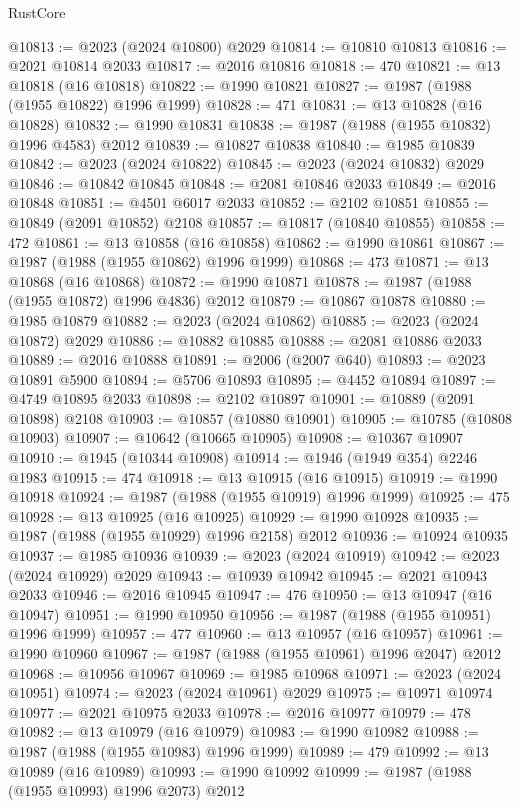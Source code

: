 \begin{lexlean}{RustCore}
\begin{coremodule}
@10813 := @2023 (@2024 @10800) @2029
@10814 := @10810 @10813
@10816 := @2021 @10814 @2033
@10817 := @2016 @10816
@10818 := 470
@10821 := @13 @10818 (@16 @10818)
@10822 := @1990 @10821
@10827 := @1987 (@1988 (@1955 @10822) @1996 @1999)
@10828 := 471
@10831 := @13 @10828 (@16 @10828)
@10832 := @1990 @10831
@10838 := @1987 (@1988 (@1955 @10832) @1996 @4583) @2012
@10839 := @10827 @10838
@10840 := @1985 @10839
@10842 := @2023 (@2024 @10822)
@10845 := @2023 (@2024 @10832) @2029
@10846 := @10842 @10845
@10848 := @2081 @10846 @2033
@10849 := @2016 @10848
@10851 := @4501 @6017 @2033
@10852 := @2102 @10851
@10855 := @10849 (@2091 @10852) @2108
@10857 := @10817 (@10840 @10855)
@10858 := 472
@10861 := @13 @10858 (@16 @10858)
@10862 := @1990 @10861
@10867 := @1987 (@1988 (@1955 @10862) @1996 @1999)
@10868 := 473
@10871 := @13 @10868 (@16 @10868)
@10872 := @1990 @10871
@10878 := @1987 (@1988 (@1955 @10872) @1996 @4836) @2012
@10879 := @10867 @10878
@10880 := @1985 @10879
@10882 := @2023 (@2024 @10862)
@10885 := @2023 (@2024 @10872) @2029
@10886 := @10882 @10885
@10888 := @2081 @10886 @2033
@10889 := @2016 @10888
@10891 := @2006 (@2007 @640)
@10893 := @2023 @10891 @5900
@10894 := @5706 @10893
@10895 := @4452 @10894
@10897 := @4749 @10895 @2033
@10898 := @2102 @10897
@10901 := @10889 (@2091 @10898) @2108
@10903 := @10857 (@10880 @10901)
@10905 := @10785 (@10808 @10903)
@10907 := @10642 (@10665 @10905)
@10908 := @10367 @10907
@10910 := @1945 (@10344 @10908)
@10914 := @1946 (@1949 @354) @2246 @1983
@10915 := 474
@10918 := @13 @10915 (@16 @10915)
@10919 := @1990 @10918
@10924 := @1987 (@1988 (@1955 @10919) @1996 @1999)
@10925 := 475
@10928 := @13 @10925 (@16 @10925)
@10929 := @1990 @10928
@10935 := @1987 (@1988 (@1955 @10929) @1996 @2158) @2012
@10936 := @10924 @10935
@10937 := @1985 @10936
@10939 := @2023 (@2024 @10919)
@10942 := @2023 (@2024 @10929) @2029
@10943 := @10939 @10942
@10945 := @2021 @10943 @2033
@10946 := @2016 @10945
@10947 := 476
@10950 := @13 @10947 (@16 @10947)
@10951 := @1990 @10950
@10956 := @1987 (@1988 (@1955 @10951) @1996 @1999)
@10957 := 477
@10960 := @13 @10957 (@16 @10957)
@10961 := @1990 @10960
@10967 := @1987 (@1988 (@1955 @10961) @1996 @2047) @2012
@10968 := @10956 @10967
@10969 := @1985 @10968
@10971 := @2023 (@2024 @10951)
@10974 := @2023 (@2024 @10961) @2029
@10975 := @10971 @10974
@10977 := @2021 @10975 @2033
@10978 := @2016 @10977
@10979 := 478
@10982 := @13 @10979 (@16 @10979)
@10983 := @1990 @10982
@10988 := @1987 (@1988 (@1955 @10983) @1996 @1999)
@10989 := 479
@10992 := @13 @10989 (@16 @10989)
@10993 := @1990 @10992
@10999 := @1987 (@1988 (@1955 @10993) @1996 @2073) @2012

\end{coremodule}
\end{lexlean}
